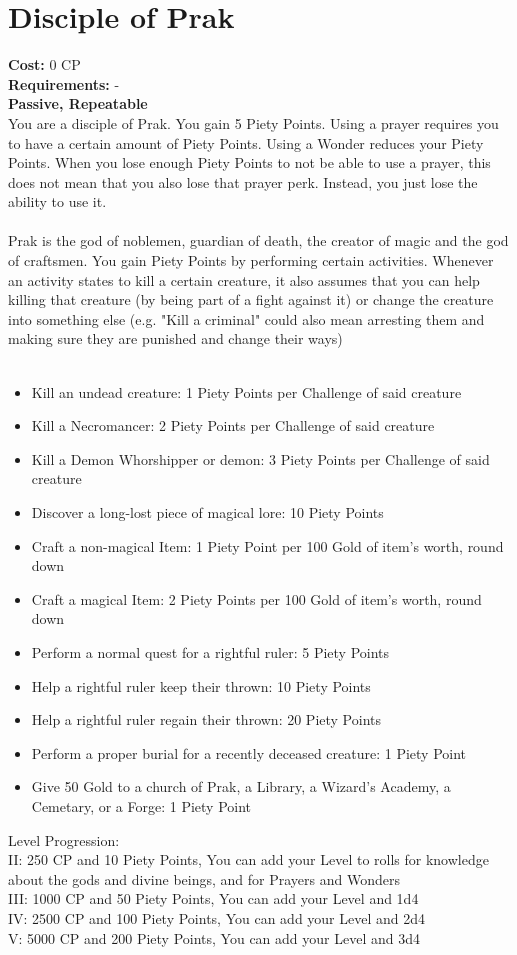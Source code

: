\section{Disciple of Prak}
\textbf{Cost:} 0 CP\\
\textbf{Requirements:} - \\
\textbf{Passive, Repeatable}\\
You are a disciple of Prak. You gain 5 Piety Points. Using a prayer requires you to have a certain amount of Piety Points. Using a Wonder reduces your Piety Points. When you lose enough Piety Points to not be able to use a prayer, this does not mean that you also lose that prayer perk. Instead, you just lose the ability to use it.\\
\\
Prak is the god of noblemen, guardian of death, the creator of magic and the god of craftsmen. You gain Piety Points by performing certain activities. Whenever an activity states to kill a certain creature, it also assumes that you can help killing that creature (by being part of a fight against it) or change the creature into something else (e.g. "Kill a criminal" could also mean arresting them and making sure they are punished and change their ways)\\
\\
\begin{itemize}
	\item Kill an undead creature: 1 Piety Points per Challenge of said creature
	\item Kill a Necromancer: 2 Piety Points per Challenge of said creature
	\item Kill a Demon Whorshipper or demon: 3 Piety Points per Challenge of said creature
	\item Discover a long-lost piece of magical lore: 10 Piety Points
	\item Craft a non-magical Item: 1 Piety Point per 100 Gold of item's worth, round down
	\item Craft a magical Item: 2 Piety Points per 100 Gold of item's worth, round down
	\item Perform a normal quest for a rightful ruler: 5 Piety Points
	\item Help a rightful ruler keep their thrown: 10 Piety Points
	\item Help a rightful ruler regain their thrown: 20 Piety Points
	\item Perform a proper burial for a recently deceased creature: 1 Piety Point
	\item Give 50 Gold to a church of Prak, a Library, a Wizard's Academy, a Cemetary, or a Forge: 1 Piety Point
\end{itemize}

Level Progression:\\
II: 250 CP and 10 Piety Points, You can add your Level to rolls for knowledge about the gods and divine beings, and for Prayers and Wonders\\
III: 1000 CP and 50 Piety Points, You can add your Level and 1d4\\
IV: 2500 CP and 100 Piety Points, You can add your Level and 2d4\\
V: 5000 CP and 200 Piety Points, You can add your Level and 3d4\\